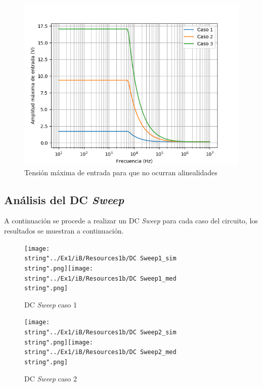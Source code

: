 \begin{figure}[H]
\begin{centering}
\includegraphics[scale=0.5]{../Ex1/iB/Resources1b/AmplMaxVsFreq123}
\par\end{centering}
\caption{Tensión máxima de entrada para que no ocurran alinealidades}
\label{1_b_30}
\end{figure}

\subsection{Análisis del DC \emph{Sweep}}

A continuación se procede a realizar un DC \emph{Sweep} para cada
caso del circuito, los resultados se muestran a continuación.

\begin{figure}[H]
\begin{centering}
\texttt{[image: \\string"../Ex1/iB/Resources1b/DC Sweep1\_sim\\string".png]}\texttt{[image: \\string"../Ex1/iB/Resources1b/DC Sweep1\_med\\string".png]}
\par\end{centering}
\caption{DC \emph{Sweep} caso 1}
\end{figure}

\begin{figure}[H]
\begin{centering}
\texttt{[image: \\string"../Ex1/iB/Resources1b/DC Sweep2\_sim\\string".png]}\texttt{[image: \\string"../Ex1/iB/Resources1b/DC Sweep2\_med\\string".png]}
\par\end{centering}
\caption{DC \emph{Sweep} caso 2}
\end{figure}

